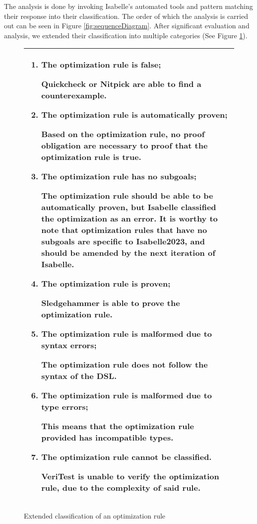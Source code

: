 The analysis is done by invoking Isabelle's automated tools and pattern matching their response into their classification. 
The order of which the analysis is carried out can be seen in Figure \ref{fig:sequenceDiagram}. After significant 
evaluation and analysis, we extended their classification into multiple categories (See Figure \ref{fig:analysisClassification}).

\begin{figure}[!htb]
    \begin{tabular}{|L{0.95\textwidth}|}
          \hline
          \begin{enumerate}
                \item The optimization rule is false;
                
                    Quickcheck or Nitpick are able to find a counterexample.
            
                \item The optimization rule is automatically proven;
                
                    Based on the optimization rule, no proof obligation are necessary to proof that the optimization rule is true.  
                
                \item The optimization rule has no subgoals;
                
                    The optimization rule should be able to be automatically proven, but Isabelle classified the optimization as an error.
                    It is worthy to note that optimization rules that have no subgoals are specific to Isabelle2023, and 
                    should be amended by the next iteration of Isabelle.
                
                \item The optimization rule is proven;
                
                    Sledgehammer is able to prove the optimization rule.
                
                \item The optimization rule is malformed due to syntax errors;
                
                    The optimization rule does not follow the syntax of the DSL.

                \item The optimization rule is malformed due to type errors;
                
                    This means that the optimization rule provided has incompatible types.
            
                \item The optimization rule cannot be classified.
                      
                    VeriTest is unable to verify the optimization rule, due to the complexity of said rule.
          \end{enumerate} \\
          \hline
    \end{tabular}
    \caption{Extended classification of an optimization rule}
    \label{fig:analysisClassification}
\end{figure}

